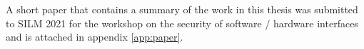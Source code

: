 A short paper that contains a summary of the work in this thesis was submitted to SILM 2021 for the workshop on the security of software / hardware interfaces and is attached in appendix \ref{app:paper}.

